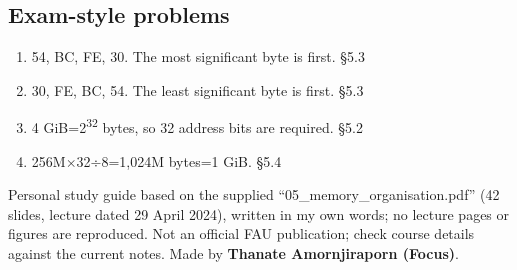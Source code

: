 \documentclass[11pt]{article}
\begin{document}
\begin{keepsection}\subsection{Exam-style problems}

\begin{enumerate}
\item 54, BC, FE, 30. The most significant byte is first. \hfill{\small\color{FAUblue}§5.3}
\item 30, FE, BC, 54. The least significant byte is first. \hfill{\small\color{FAUblue}§5.3}
\item 4 GiB=2\textsuperscript{32} bytes, so 32 address bits are required. \hfill{\small\color{FAUblue}§5.2}
\item 256M\ensuremath{\times}32÷8=1,024M bytes=1 GiB. \hfill{\small\color{FAUblue}§5.4}
\end{enumerate}

\end{keepsection}

\vfill{\small Personal study guide based on the supplied “05\_memory\_organisation.pdf” (42 slides, lecture dated 29 April 2024), written in my own words; no lecture pages or figures are reproduced. Not an official FAU publication; check course details against the current notes. Made by \textbf{Thanate Amornjiraporn (Focus)}.}
\end{document}
